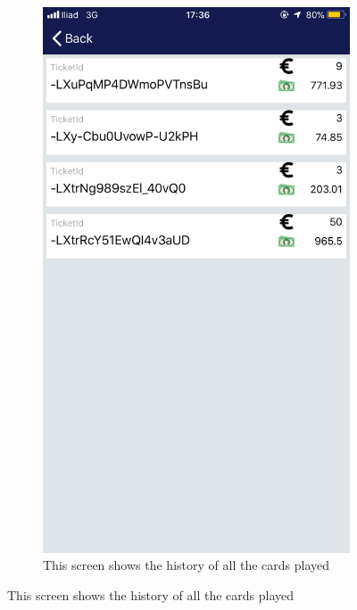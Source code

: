 \documentclass[numbers=noenddot, 12pt, a4paper, oneside]{scrbook}
\begin{document}
\begin{figure}[H]
	\centering
	\begin{subfigure}{.5\textwidth}
		\centering
		\includegraphics[width=.8\linewidth]{images/Screen/Storico}
		\caption{This screen shows the history of all the cards played}
	\end{subfigure}
\end{figure}
\end{document}
